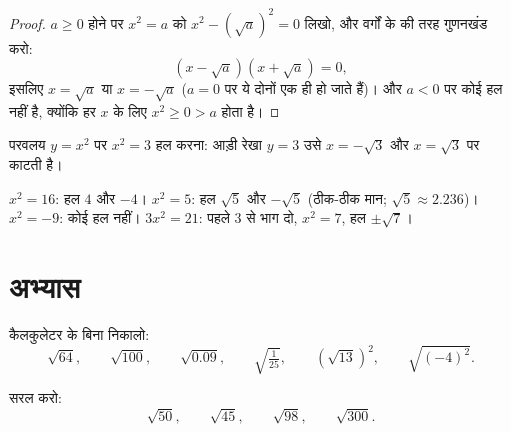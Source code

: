 \begin{proof}
$a \geq 0$ होने पर $x^2 = a$ को $x^2 - \left(\sqrt a\right)^2 = 0$
लिखो, और वर्गों के  की तरह गुणनखंड करो:
\[
\left(x - \sqrt a\right)\left(x + \sqrt a\right) = 0 ,
\]
इसलिए $x = \sqrt a$ या $x = -\sqrt a$ ($a = 0$ पर ये दोनों एक ही हो
जाते हैं)। और $a < 0$ पर कोई हल नहीं है, क्योंकि हर $x$ के लिए
$x^2 \geq 0 > a$ होता है।
\end{proof}

\begin{omfigure}

{\small परवलय $y = x^2$ पर $x^2 = 3$ हल करना: आड़ी रेखा $y = 3$ उसे
$x = -\sqrt3$ और $x = \sqrt3$ पर काटती है।}
\end{omfigure}

\begin{example}
$x^2 = 16$: हल $4$ और $-4$। \quad
$x^2 = 5$: हल $\sqrt5$ और $-\sqrt5$ (ठीक-ठीक मान; $\sqrt5
\approx 2.236$)। \quad
$x^2 = -9$: कोई हल नहीं। \quad
$3x^2 = 21$: पहले $3$ से भाग दो, $x^2 = 7$, हल $\pm\sqrt7$।
\end{example}

\section{अभ्यास}

\begin{exercise}[$\star$]\label{exo:g9:sqrt:1}
कैलकुलेटर के बिना निकालो:
\[
\sqrt{64}, \qquad \sqrt{100}, \qquad \sqrt{0.09}, \qquad
\sqrt{\tfrac{1}{25}}, \qquad \left(\sqrt{13}\right)^2, \qquad
\sqrt{(-4)^2} .
\]
\end{exercise}

\begin{exercise}[$\star$]\label{exo:g9:sqrt:2}
सरल करो:
\[
\sqrt{50}, \qquad \sqrt{45}, \qquad \sqrt{98}, \qquad \sqrt{300} .
\]
\end{exercise}

